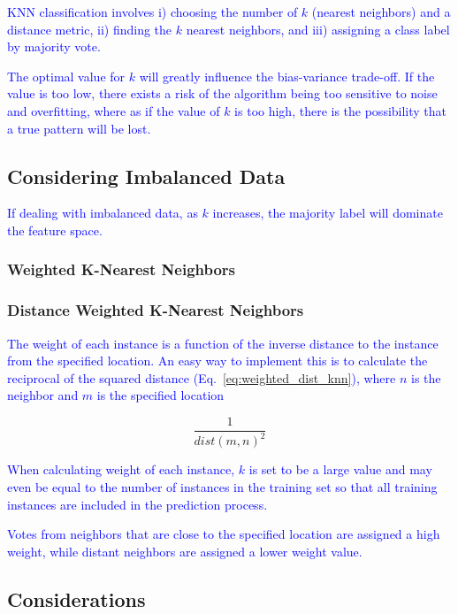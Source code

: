 \textcolor{blue}{KNN classification involves i) choosing the number of $k$ (nearest neighbors) and a distance metric, ii) finding the $k$ nearest neighbors, and iii) assigning a class label by majority vote.}

\textcolor{blue}{The optimal value for $k$ will greatly influence the bias-variance trade-off. If the value is too low, there exists a risk of the algorithm being too sensitive to noise and overfitting, where as if the value of $k$ is too high, there is the possibility that a true pattern will be lost.}

\subsection{Considering Imbalanced Data}

\textcolor{blue}{If dealing with imbalanced data, as $k$ increases, the majority label will dominate the feature space.}

\subsubsection{Weighted K-Nearest Neighbors}



\subsubsection{Distance Weighted K-Nearest Neighbors}

\textcolor{blue}{The weight of each instance is a function of the inverse distance to the instance from the specified location. An easy way to implement this is to calculate the reciprocal of the squared distance (Eq.~\ref{eq:weighted_dist_knn}), where $n$ is the neighbor and $m$ is the specified location}

\begin{equation}
{\frac{1}{{dist(m,n)}^2}}
\label{eq:weighted_dist_knn}
\end{equation}

\textcolor{blue}{When calculating weight of each instance, $k$ is set to be a large value and may even be equal to the number of instances in the training set so that all training instances are included in the prediction process.}

\textcolor{blue}{Votes from neighbors that are close to the specified location are assigned a high weight, while distant neighbors are assigned a lower weight value.}

\subsection{Considerations}

